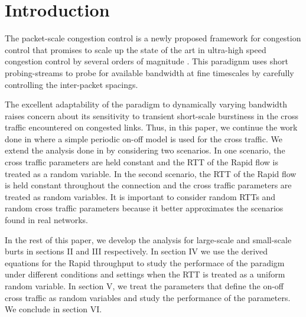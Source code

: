 \section{Introduction}
  The packet-scale congestion control is a newly proposed framework for 
  congestion control that promises to scale up the state of the art in 
  ultra-high speed congestion control by several orders of magnitude 
  \cite{Konda-infocom09}. This paradignm uses short probing-streams to probe 
  for available bandwidth at fine timescales by carefully controlling the 
  inter-packet spacings.

  The excellent adaptability of the paradigm to dynamically varying 
  bandwidth raises concern about its sensitivity to transient short-scale 
  burstiness in the cross traffic encountered on congested links. Thus, in 
  this paper, we continue the work done in \cite{Lovewell2011-Noise-TR} where 
  a simple periodic on-off model is used for the cross traffic. We extend the 
  analysis done in \cite{Lovewell2011-Noise-TR} by considering two scenarios.
  In one scenario, the cross traffic parameters are held constant and the RTT 
  of the Rapid flow is treated as a random variable. In the second 
  scenario, the RTT of the Rapid flow is held constant throughout the 
  connection and the cross traffic parameters are treated as random variables. 
  It is important to consider random RTTs and random cross traffic parameters 
  because it better approximates the scenarios found in real networks.

  In the rest of this paper, we develop the analysis for large-scale and 
  small-scale burts in sections II and III respectively. In section IV we use 
  the derived equations for the Rapid throughput to study the performace of 
  the paradigm under different conditions and settings when the RTT is treated 
  as a uniform random variable. In section V, we treat the parameters that 
  define the on-off cross traffic as random variables and study the 
  performance of the parameters. We conclude in section VI.

